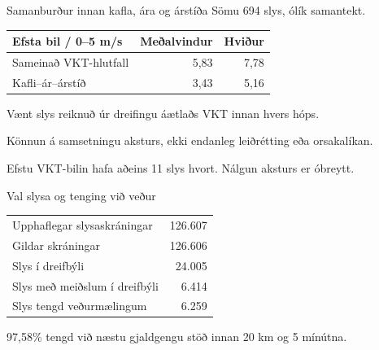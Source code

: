 \documentclass[aspectratio=169,12pt,t]{beamer}
\begin{document}
\begin{frame}{Samanburður innan kafla, ára og árstíða}
\relax
Sömu 694 slys, ólík samantekt.\par
\vspace{4mm}
\renewcommand{\arraystretch}{1.35}
\begin{tabular}{@{}lrr@{}}\toprule
Efsta bil / 0--5 m/s & Meðalvindur & Hviður\\\midrule
Sameinað VKT-hlutfall & 5,83 & 7,78\\
Kafli--ár--árstíð & 3,43 & 5,16\\\bottomrule
\end{tabular}\par
\vspace{4mm}
Vænt slys reiknuð úr dreifingu áætlaðs VKT innan hvers hóps.\par
Könnun á samsetningu aksturs, ekki endanleg leiðrétting eða orsakalíkan.\par
{\small Efstu VKT-bilin hafa aðeins 11 slys hvort. Nálgun aksturs er óbreytt.\par}
\end{frame}

\begin{frame}{Val slysa og tenging við veður}
\relax
{\centering\renewcommand{\arraystretch}{1.35}
\begin{tabular}{@{}lr@{}}
\toprule
Upphaflegar slysaskráningar & 126.607\\
Gildar skráningar & 126.606\\
Slys í dreifbýli & 24.005\\
Slys með meiðslum í dreifbýli & 6.414\\
Slys tengd veðurmælingum & 6.259\\
\bottomrule
\end{tabular}\par}
\par\vspace{3mm}
97,58\% tengd við næstu gjaldgengu stöð innan 20 km og 5 mínútna.\par
{}
\end{frame}
\end{document}
